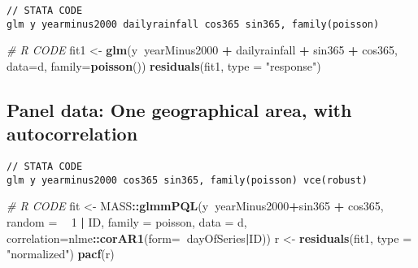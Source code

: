 \documentclass[]{book}
\newenvironment{Shaded}{\begin{snugshade}}{\end{snugshade}}
\newcommand{\KeywordTok}[1]{\textcolor[rgb]{0.13,0.29,0.53}{\textbf{#1}}}
\newcommand{\DataTypeTok}[1]{\textcolor[rgb]{0.13,0.29,0.53}{#1}}
\newcommand{\DecValTok}[1]{\textcolor[rgb]{0.00,0.00,0.81}{#1}}
\newcommand{\StringTok}[1]{\textcolor[rgb]{0.31,0.60,0.02}{#1}}
\newcommand{\CommentTok}[1]{\textcolor[rgb]{0.56,0.35,0.01}{\textit{#1}}}
\newcommand{\OperatorTok}[1]{\textcolor[rgb]{0.81,0.36,0.00}{\textbf{#1}}}
\newcommand{\NormalTok}[1]{#1}
\begin{document}
\begin{verbatim}
// STATA CODE
glm y yearminus2000 dailyrainfall cos365 sin365, family(poisson)
\end{verbatim}

\begin{Shaded}
\begin{Highlighting}[]
\CommentTok{# R CODE}
\NormalTok{fit1 <-}\StringTok{ }\KeywordTok{glm}\NormalTok{(y}\OperatorTok{~}\NormalTok{yearMinus2000 }\OperatorTok{+}\StringTok{ }\NormalTok{dailyrainfall }\OperatorTok{+}\StringTok{ }\NormalTok{sin365 }\OperatorTok{+}\StringTok{ }\NormalTok{cos365, }\DataTypeTok{data=}\NormalTok{d, }\DataTypeTok{family=}\KeywordTok{poisson}\NormalTok{())}
\KeywordTok{residuals}\NormalTok{(fit1, }\DataTypeTok{type =} \StringTok{"response"}\NormalTok{)}
\end{Highlighting}
\end{Shaded}

\subsection{Panel data: One geographical area, with
autocorrelation}\label{panel-data-one-geographical-area-with-autocorrelation}

\begin{verbatim}
// STATA CODE
glm y yearminus2000 cos365 sin365, family(poisson) vce(robust)
\end{verbatim}

\begin{Shaded}
\begin{Highlighting}[]
\CommentTok{# R CODE}
\NormalTok{fit <-}\StringTok{ }\NormalTok{MASS}\OperatorTok{::}\KeywordTok{glmmPQL}\NormalTok{(y}\OperatorTok{~}\NormalTok{yearMinus2000}\OperatorTok{+}\NormalTok{sin365 }\OperatorTok{+}\StringTok{ }\NormalTok{cos365, }\DataTypeTok{random =} \OperatorTok{~}\StringTok{ }\DecValTok{1} \OperatorTok{|}\StringTok{ }\NormalTok{ID,}
                \DataTypeTok{family =}\NormalTok{ poisson, }\DataTypeTok{data =}\NormalTok{ d,}
                \DataTypeTok{correlation=}\NormalTok{nlme}\OperatorTok{::}\KeywordTok{corAR1}\NormalTok{(}\DataTypeTok{form=}\OperatorTok{~}\NormalTok{dayOfSeries}\OperatorTok{|}\NormalTok{ID))}
\NormalTok{r <-}\StringTok{ }\KeywordTok{residuals}\NormalTok{(fit1, }\DataTypeTok{type =} \StringTok{"normalized"}\NormalTok{)}
\KeywordTok{pacf}\NormalTok{(r)}
\end{Highlighting}
\end{Shaded}
\end{document}
